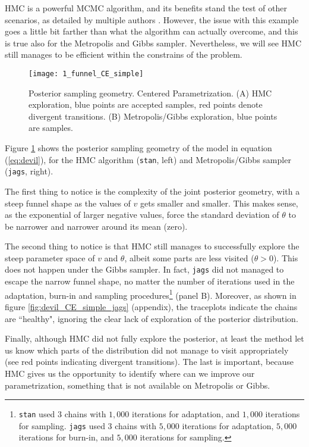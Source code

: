 HMC is a powerful MCMC algorithm, and its benefits stand the test of other scenarios, as detailed by multiple authors \cite{McElreath_2020, Gelman_et_al_2014}. However, the issue with this example goes a little bit farther than what the algorithm can actually overcome, and this is true also for the Metropolis and Gibbs sampler. Nevertheless, we will see HMC still manages to be efficient within the constrains of the problem.
%
\begin{figure}[h]
	\centering
	\texttt{[image: 1\_funnel\_CE\_simple]}
	\caption[Posterior sampling geometry. Centered Parametrization.]%
	{Posterior sampling geometry. Centered Parametrization. (A) HMC exploration, blue points are accepted samples, red points denote divergent transitions. (B) Metropolis/Gibbs exploration, blue points are samples.}
	\label{fig:devil_CE_geom}
\end{figure}

Figure \ref{fig:devil_CE_geom} shows the posterior sampling geometry of the model in equation (\ref{eq:devil}), for the HMC algorithm (\texttt{stan}, left) and Metropolis/Gibbs sampler (\texttt{jags}, right). 

The first thing to notice is the complexity of the joint posterior geometry, with a steep funnel shape as the values of $v$ gets smaller and smaller. This makes sense, as the exponential of larger negative values, force the standard deviation of $\theta$ to be narrower and narrower around its mean (zero). 

The second thing to notice is that HMC still manages to successfully explore the steep parameter space of $v$ and $\theta$, albeit some parts are less visited ($\theta>0$). This does not happen under the Gibbs sampler. In fact, \texttt{jags} did not managed to escape the narrow funnel shape, no matter the number of iterations used in the adaptation, burn-in and sampling procedures\footnote{\texttt{stan} used $3$ chains with $1,000$ iterations for adaptation, and $1,000$ iterations for sampling. \texttt{jags} used $3$ chains with $5,000$ iterations for adaptation, $5,000$ iterations for burn-in, and $5,000$ iterations for sampling.} (panel B). Moreover, as shown in figure \ref{fig:devil_CE_simple_jags} (appendix), the traceplots indicate the chains are ``healthy", ignoring the clear lack of exploration of the posterior distribution.

Finally, although HMC did not fully explore the posterior, at least the method let us know which parts of the distribution did not manage to visit appropriately (see red points indicating divergent transitions). The last is important, because HMC gives us the opportunity to identify where can we improve our parametrization, something that is not available on Metropolis or Gibbs.


